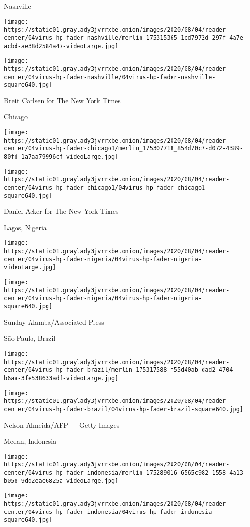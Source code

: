 \href{https://www.nytimes3xbfgragh.onion/2020/08/04/world/coronavirus-covid-19.html}{}

Nashville

\texttt{[image: https://static01.graylady3jvrrxbe.onion/images/2020/08/04/reader-center/04virus-hp-fader-nashville/merlin\_175315365\_1ed7972d-297f-4a7e-acbd-ae38d2584a47-videoLarge.jpg]}

\texttt{[image: https://static01.graylady3jvrrxbe.onion/images/2020/08/04/reader-center/04virus-hp-fader-nashville/04virus-hp-fader-nashville-square640.jpg]}

Brett Carlsen for The New York Times

Chicago

\texttt{[image: https://static01.graylady3jvrrxbe.onion/images/2020/08/04/reader-center/04virus-hp-fader-chicago1/merlin\_175307718\_854d70c7-d072-4389-80fd-1a7aa79996cf-videoLarge.jpg]}

\texttt{[image: https://static01.graylady3jvrrxbe.onion/images/2020/08/04/reader-center/04virus-hp-fader-chicago1/04virus-hp-fader-chicago1-square640.jpg]}

Daniel Acker for The New York Times

Lagos, Nigeria

\texttt{[image: https://static01.graylady3jvrrxbe.onion/images/2020/08/04/reader-center/04virus-hp-fader-nigeria/04virus-hp-fader-nigeria-videoLarge.jpg]}

\texttt{[image: https://static01.graylady3jvrrxbe.onion/images/2020/08/04/reader-center/04virus-hp-fader-nigeria/04virus-hp-fader-nigeria-square640.jpg]}

Sunday Alamba/Associated Press

São Paulo, Brazil

\texttt{[image: https://static01.graylady3jvrrxbe.onion/images/2020/08/04/reader-center/04virus-hp-fader-brazil/merlin\_175317588\_f55d40ab-dad2-4704-b6aa-3fe538633adf-videoLarge.jpg]}

\texttt{[image: https://static01.graylady3jvrrxbe.onion/images/2020/08/04/reader-center/04virus-hp-fader-brazil/04virus-hp-fader-brazil-square640.jpg]}

Nelson Almeida/AFP --- Getty Images

Medan, Indonesia

\texttt{[image: https://static01.graylady3jvrrxbe.onion/images/2020/08/04/reader-center/04virus-hp-fader-indonesia/merlin\_175289016\_6565c982-1558-4a13-b058-9dd2eae6825a-videoLarge.jpg]}

\texttt{[image: https://static01.graylady3jvrrxbe.onion/images/2020/08/04/reader-center/04virus-hp-fader-indonesia/04virus-hp-fader-indonesia-square640.jpg]}

